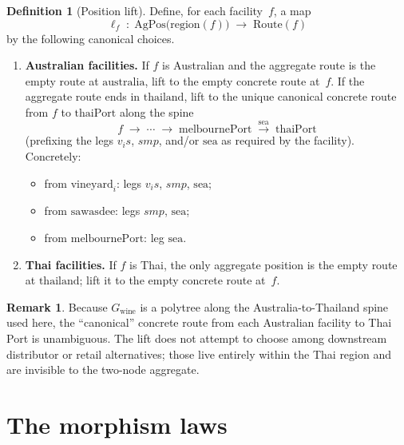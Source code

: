 \documentclass[11pt,a4paper]{article}
\theoremstyle{plain}
\theoremstyle{definition}
\newtheorem{definition}[theorem]{Definition}
\newtheorem{remark}[theorem]{Remark}
\begin{document}
\begin{definition}[Position lift]\label{def:lift}
Define, for each facility~$f$, a map
\begin{equation}
  \ell_f \;:\;
  \mathrm{AgPos}\bigl(\mathrm{region}(f)\bigr)
  \;\longrightarrow\;
  \mathrm{Route}(f)
\end{equation}
by the following canonical choices.
\begin{enumerate}
  \item \textbf{Australian facilities.} If $f$ is Australian and the aggregate
        route is the empty route at $\mathrm{australia}$, lift to the empty
        concrete route at~$f$. If the aggregate route ends in
        $\mathrm{thailand}$, lift to the unique canonical concrete route from
        $f$ to $\mathrm{thaiPort}$ along the spine
        \[
          f \;\to\; \cdots \;\to\;
          \mathrm{melbournePort} \;\xrightarrow{\mathrm{sea}}\;
          \mathrm{thaiPort}
        \]
        (prefixing the legs $v_is$, $smp$, and/or $\mathrm{sea}$ as required by
        the facility). Concretely:
        \begin{itemize}
          \item from $\mathrm{vineyard}_i$: legs $v_is$, $smp$, $\mathrm{sea}$;
          \item from $\mathrm{sawasdee}$: legs $smp$, $\mathrm{sea}$;
          \item from $\mathrm{melbournePort}$: leg $\mathrm{sea}$.
        \end{itemize}
  \item \textbf{Thai facilities.} If $f$ is Thai, the only aggregate position
        is the empty route at $\mathrm{thailand}$; lift it to the empty
        concrete route at~$f$.
\end{enumerate}
\end{definition}

\begin{remark}
Because $G_{\mathrm{wine}}$ is a polytree along the Australia-to-Thailand spine
used here, the ``canonical'' concrete route from each Australian facility to
Thai Port is unambiguous. The lift does not attempt to choose among downstream
distributor or retail alternatives; those live entirely within the Thai region
and are invisible to the two-node aggregate.
\end{remark}

\section{The morphism laws}
\end{document}
